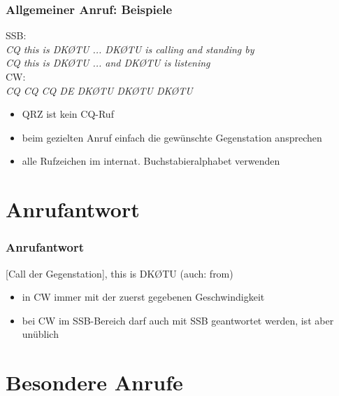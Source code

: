 \begin{frame}
    \frametitle{Allgemeiner Anruf: Beispiele}

    SSB: \\
    \emph{CQ this is DKØTU ... DKØTU is calling and standing by} \\
    \emph{CQ this is DKØTU ... and DKØTU is listening}\\[2em]
    
    CW: \\
    \emph{CQ CQ CQ DE DKØTU DKØTU DKØTU} \\[2em]

    \begin{itemize}
        \item QRZ ist kein CQ-Ruf
        \item beim gezielten Anruf einfach die gewünschte Gegenstation ansprechen
        \item alle Rufzeichen im internat. Buchstabieralphabet verwenden
    \end{itemize}

\end{frame}

\section{Anrufantwort}

\begin{frame}
    \frametitle{Anrufantwort}

    [Call der Gegenstation], this is DKØTU (auch: from)

    \begin{itemize}
        \item in CW immer mit der zuerst gegebenen Geschwindigkeit
        \item bei CW im SSB-Bereich darf auch mit SSB geantwortet werden, ist aber
              unüblich
    \end{itemize}

\end{frame}

\section{Besondere Anrufe}


